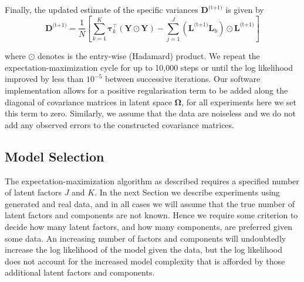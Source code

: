\documentclass[twocolumn]{aastex62}
\newcommand{\vect}[1]{\boldsymbol{\mathbf{#1}}}
\renewcommand{\vec}[1]{\vect{#1}}
\newcommand{\data}{\textbf{Y}}
\newcommand{\vecdata}{\vec\data}
\newcommand{\nextstep}{^\textrm{(t+1)}}
\newcommand{\transpose}{^\intercal}
\newcommand{\factorloads}{\textbf{L}}
\newcommand{\specificvariance}{\vec{D}}
\newcommand{\scorecovs}{\vec\Omega}
\newcommand{\NumData}{N}
\newcommand{\NumLatentFactors}{J}
\newcommand{\NumComponents}{K}
\newcommand{\numcomponents}{k}
\begin{document}
Finally, the updated estimate of the specific variances $\specificvariance\nextstep$ is given
by
\begin{equation}
	\specificvariance\nextstep = \frac{1}{\NumData}\left[\sum^{\NumComponents}_{\numcomponents=1}\vec\tau_\numcomponents\transpose\left(\vecdata\odot\vecdata\right) - \sum_{j=1}^{J}\left(\factorloads\nextstep\factorloads_\textrm{b}\right)\odot\factorloads\nextstep\right]
\end{equation}

\noindent{}where $\odot$ denotes is the entry-wise (Hadamard) product. We repeat
the expectation-maximization cycle for up to 10,000 steps or until the log likelihood
improved by less than $10^{-5}$ between successive iterations. 
Our software implementation allows for a positive regularisation term to be added
along the diagonal of covariance matrices in latent space $\scorecovs$, for all experiments
here we set this term to zero. Similarly, we assume that the data are noiseless and
we do not add any observed errors to the constructed covariance matrices.




\subsection{Model Selection}

The expectation-maximization algorithm as described requires a specified 
number of latent factors $\NumLatentFactors$ and $\NumComponents$. In the next 
Section we describe experiments using generated and real data, and in all cases we will
assume that the true number of latent factors and components are not known. 
Hence we require some criterion to decide how many latent factors, and how many
components, are preferred given some data. An increasing number of factors
and components will undoubtedly increase the log likelihood of the model given
the data, but the log likelihood does not account for the increased model 
complexity that is afforded by those additional latent factors and components.
\end{document}
